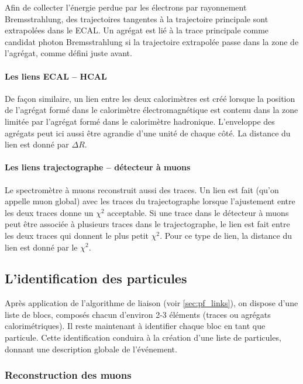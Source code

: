 Afin de collecter l'énergie perdue par les électrons par rayonnement Bremsstrahlung, des trajectoires tangentes à la trajectoire principale sont extrapolées dans le ECAL. Un agrégat est lié à la trace principale comme candidat photon Bremsstrahlung si la trajectoire extrapolée passe dans la zone de l'agrégat, comme défini juste avant.

\paragraph{Les liens ECAL – HCAL}

De façon similaire, un lien entre les deux calorimètres est créé lorsque la position de l'agrégat formé dans le calorimètre électromagnétique est contenu dans la zone limitée par l'agrégat formé dans le calorimètre hadronique. L'enveloppe des agrégats peut ici aussi être agrandie d'une unité de chaque côté. La distance du lien est donné par $\Delta R$. %

\paragraph{Les liens trajectographe – détecteur à muons} \label{sec:pf_link_mu}

Le spectromètre à muons reconstruit aussi des traces. Un lien est fait (qu'on appelle muon global) avec les traces du trajectographe lorsque l'ajustement entre les deux traces donne un $\chi^2$ acceptable. Si une trace dans le détecteur à muons peut être associée à plusieurs traces dans le trajectographe, le lien est fait entre les deux traces qui donnent le plus petit $\chi^2$. Pour ce type de lien, la distance du lien est donné par le $\chi^2$.

\subsection{L'identification des particules}

Après application de l'algorithme de liaison (voir \cref{sec:pf_links}), on dispose d'une liste de blocs, composés chacun d'environ 2-3 éléments (traces ou agrégats calorimétriques). Il reste maintenant à identifier chaque bloc en tant que particule. Cette identification conduira à la création d'une liste de particules, donnant une description globale de l'événement.

\subsubsection{Reconstruction des muons} \label{sec:muon_reco}

